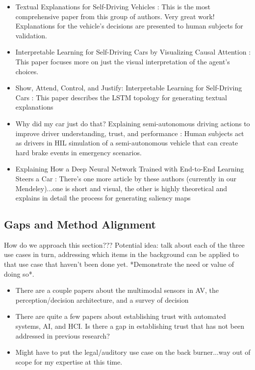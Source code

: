 \begin{itemize}
    \item Textual Explanations for Self-Driving Vehicles \cite{kim2018textual}: This is the most comprehensive paper from this group of authors.  Very great work!  Explanations for the vehicle's decisions are presented to human subjects for validation.

    \item Interpretable Learning for Self-Driving Cars by Visualizing Causal Attention \cite{Kim2017InterpretableLF}:  This paper focuses more on just the visual interpretation of the agent's choices.

    \item Show, Attend, Control, and Justify: Interpretable Learning for Self-Driving Cars \cite{Kim2017ShowA}: This paper describes the LSTM topology for generating textual explanations

    \item Why did my car just do that? Explaining semi-autonomous driving actions to improve driver understanding, trust, and performance \cite{Koo2015}:  Human subjects act as drivers in HIL simulation of a semi-autonomous vehicle that can create hard brake events in emergency scenarios.
    
    \item Explaining How a Deep Neural Network Trained with End-to-End Learning Steers a Car \cite{Bojarski2017ExplainingHA}: There's one more article by these authors (currently in our Mendeley)...one is short and visual, the other is highly theoretical and explains in detail the process for generating saliency maps
\end{itemize}

\subsection{Gaps and Method Alignment}

How do we approach this section???  Potential idea:  talk about each of the three use cases in turn, addressing which items in the background can be applied to that use case that haven't been done yet.  *Demonstrate the need or value of doing so*.

\begin{itemize}
    \item There are a couple papers about the multimodal sensors in AV, the perception/decision architecture, and a survey of decision 
    \item There are quite a few papers about establishing trust with automated systems, AI, and HCI.  Is there a gap in establishing trust that has not been addressed in previous research?
    \item Might have to put the legal/auditory use case on the back burner...way out of scope for my expertise at this time.
\end{itemize}
